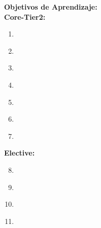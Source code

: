 \noindent \textbf{Objetivos de Aprendizaje:}\\
\noindent \textbf{Core-Tier2:}
\begin{enumerate}
	\setcounter{enumi}{0}
	\item \PDParallelAlgorithmsAnalysisandProgrammingLODefineCritical\xspace[\PDParallelAlgorithmsAnalysisandProgrammingLODefineCriticalLevel]\label{sec:BOK:PDParallelAlgorithmsAnalysisandProgrammingLODefineCritical}
	\item \PDParallelAlgorithmsAnalysisandProgrammingLOComputeTheSpan\xspace[\PDParallelAlgorithmsAnalysisandProgrammingLOComputeTheSpanLevel]\label{sec:BOK:PDParallelAlgorithmsAnalysisandProgrammingLOComputeTheSpan}
	\item \PDParallelAlgorithmsAnalysisandProgrammingLODefineSpeed\xspace[\PDParallelAlgorithmsAnalysisandProgrammingLODefineSpeedLevel]\label{sec:BOK:PDParallelAlgorithmsAnalysisandProgrammingLODefineSpeed}
	\item \PDParallelAlgorithmsAnalysisandProgrammingLOIdentifyIndependent\xspace[\PDParallelAlgorithmsAnalysisandProgrammingLOIdentifyIndependentLevel]\label{sec:BOK:PDParallelAlgorithmsAnalysisandProgrammingLOIdentifyIndependent}
	\item \PDParallelAlgorithmsAnalysisandProgrammingLOCharacterizeFeatures\xspace[\PDParallelAlgorithmsAnalysisandProgrammingLOCharacterizeFeaturesLevel]\label{sec:BOK:PDParallelAlgorithmsAnalysisandProgrammingLOCharacterizeFeatures}
	\item \PDParallelAlgorithmsAnalysisandProgrammingLOImplementAAnd\xspace[\PDParallelAlgorithmsAnalysisandProgrammingLOImplementAAndLevel]\label{sec:BOK:PDParallelAlgorithmsAnalysisandProgrammingLOImplementAAnd}
	\item \PDParallelAlgorithmsAnalysisandProgrammingLODecompose\xspace[\PDParallelAlgorithmsAnalysisandProgrammingLODecomposeLevel]\label{sec:BOK:PDParallelAlgorithmsAnalysisandProgrammingLODecompose}
\end{enumerate}
\noindent \textbf{Elective:}
\begin{enumerate}
	\setcounter{enumi}{7}
	\item \PDParallelAlgorithmsAnalysisandProgrammingLOProvideAn\xspace[\PDParallelAlgorithmsAnalysisandProgrammingLOProvideAnLevel]\label{sec:BOK:PDParallelAlgorithmsAnalysisandProgrammingLOProvideAn}
	\item \PDParallelAlgorithmsAnalysisandProgrammingLOGiveExamplesWhere\xspace[\PDParallelAlgorithmsAnalysisandProgrammingLOGiveExamplesWhereLevel]\label{sec:BOK:PDParallelAlgorithmsAnalysisandProgrammingLOGiveExamplesWhere}
	\item \PDParallelAlgorithmsAnalysisandProgrammingLOImplementAAlgorithm\xspace[\PDParallelAlgorithmsAnalysisandProgrammingLOImplementAAlgorithmLevel]\label{sec:BOK:PDParallelAlgorithmsAnalysisandProgrammingLOImplementAAlgorithm}
	\item \PDParallelAlgorithmsAnalysisandProgrammingLOIdentifyIssuesIn\xspace[\PDParallelAlgorithmsAnalysisandProgrammingLOIdentifyIssuesInLevel]\label{sec:BOK:PDParallelAlgorithmsAnalysisandProgrammingLOIdentifyIssuesIn}
\end{enumerate}


